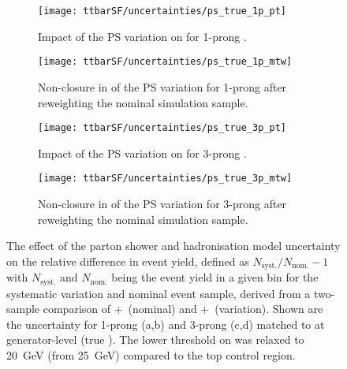 \begin{figure}[htbp]
  \centering

  \begin{subfigure}[t]{.48\textwidth}
    \texttt{[image: ttbarSF/uncertainties/ps\_true\_1p\_pt]}
    \caption{Impact of the PS variation on \tauhadvis \pT for 1-prong
      \tauhadvis.}
    \label{fig:ttbarSF_uncertainty_ps_1p_pt}
  \end{subfigure}\hfill%
  \begin{subfigure}[t]{.48\textwidth}
    \texttt{[image: ttbarSF/uncertainties/ps\_true\_1p\_mtw]}
    \caption{Non-closure in \mTW of the PS variation for 1-prong
      \tauhadvis after reweighting the nominal simulation sample.}
    \label{fig:ttbarSF_uncertainty_ps_1p_mtw}
  \end{subfigure}

  \vspace{0.5em}

  \begin{subfigure}[t]{.48\textwidth}
    \texttt{[image: ttbarSF/uncertainties/ps\_true\_3p\_pt]}
    \caption{Impact of the PS variation on \tauhadvis \pT for 3-prong
      \tauhadvis.}
    \label{fig:ttbarSF_uncertainty_ps_3p_pt}
  \end{subfigure}\hfill%
  \begin{subfigure}[t]{.48\textwidth}
    \texttt{[image: ttbarSF/uncertainties/ps\_true\_3p\_mtw]}
    \caption{Non-closure in \mTW of the PS variation for 3-prong
      \tauhadvis after reweighting the nominal simulation sample.}
    \label{fig:ttbarSF_uncertainty_ps_3p_mtw}
  \end{subfigure}

  \caption{The effect of the parton shower and hadronisation model
    uncertainty on the relative difference in event yield, defined as
    $N_{\text{syst.}} / N_{\text{nom.}} - 1$ with $N_{\text{syst.}}$
    and $N_{\text{nom.}}$ being the event yield in a given bin for the
    systematic variation and nominal event sample, derived from a
    two-sample comparison of \POWHEGBOX[v2]+~\PYTHIA[8] (nominal) and
    \POWHEGBOX[v2]+~\HERWIG[7] (variation). Shown are the uncertainty
    for 1-prong (a,b) and 3-prong (c,d) \tauhadvis matched to \tauhad
    at generator-level (true \tauhadvis). The lower threshold on
    \tauhadvis \pT was relaxed to \SI{20}{\GeV} (from \SI{25}{\GeV})
    compared to the top control region.}%
  \label{fig:ttbarSF_uncertainty_ps}
\end{figure}

